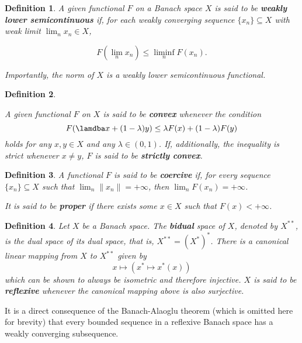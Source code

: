 \documentclass[twocolumn,twoside,a4paper,10pt]{IEEEtran}
\newtheorem{definition}{Definition}
\begin{document}
\begin{definition}
  A given functional \(F\) on a Banach space \(X\) is said to be \textbf{weakly lower semicontinuous} if, for each weakly converging sequence \(\{x_n\}\subseteq X\) with weak limit \(\lim_nx_n\in X\),

  \[
    F(\lim_nx_n)\leq \liminf_n F(x_n)
  .\]

  Importantly, the norm of \(X\) is a weakly lower semicontinuous functional.
\end{definition}

\begin{definition}\label{def:convexity}

  A given functional \(F\) on \(X\) is said to be \textbf{convex} whenever the condition
  \[
    F(\lamdba x + (1-\lambda)y) \leq \lambda F(x) + (1-\lambda) F(y)
  \]
  holds for any \(x, y\in X\) and any \(\lambda\in(0, 1)\). If, additionally, the inequality is strict whenever \(x\neq y\), \(F\) is said to be \textbf{strictly convex}.
\end{definition}

\begin{definition}
  A functional \(F\) is said to be \textbf{coercive} if, for every sequence \(\{x_n\}\subseteq X\) such that \(\lim_n \|x_n\|=+\infty\), then \(\lim_nF(x_n)=+\infty\).

  It is said to be \textbf{proper} if there exists some \(x\in X\) such that \(F(x) < +\infty\).
\end{definition}

\begin{definition}
  Let \(X\) be a Banach space. The \textbf{bidual} space of \(X\), denoted by \(X^{**}\), is the dual space of its dual space, that is, \(X^{**}=(X^*)^*\). There is a canonical linear mapping from \(X\) to \(X^{**}\) given by
  \[
    x\mapsto(x^*\mapsto x^*(x))
  \]
  which can be shown to always be isometric and therefore injective. \(X\) is said to be \textbf{reflexive} whenever the canonical mapping above is also surjective.
\end{definition}

It is a direct consequence of the Banach-Alaoglu theorem (which is omitted here for brevity) that every bounded sequence in a reflexive Banach space has a weakly converging subsequence.
\end{document}
